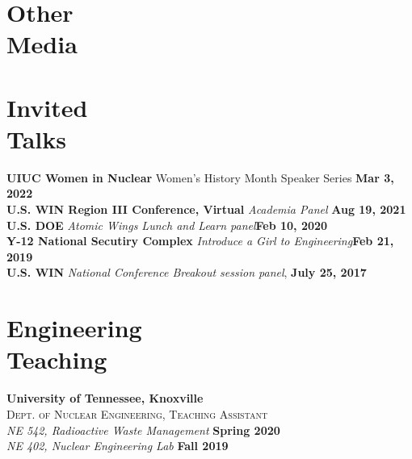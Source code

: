 \documentclass[margin,line]{resume}
\begin{document}
\begin{resume}
    \section{\mysidestyle Other\\Media}
    \begin{bibenum}
        \item {}
        \item {}
    \end{bibenum}
    \section{\mysidestyle Invited\\Talks}
    \textbf{UIUC Women in Nuclear} Women's History Month Speaker Series \hfill\textbf{Mar 3, 2022}\\
    \textbf{U.S. WIN Region III Conference, Virtual} \textsl{Academia Panel} \hfill \textbf{Aug 19, 2021}\\
    \textbf{U.S. DOE} \textsl{Atomic Wings Lunch and Learn panel}\hfill \textbf{Feb 10, 2020} \\
    \textbf{Y-12 National Secutiry Complex} \textsl{Introduce a Girl to Engineering}\hfill \textbf{Feb 21, 2019} \\
    \textbf{U.S. WIN} \textsl{National Conference Breakout session panel}, \hfill \textbf{July 25, 2017} \\
    \section{\mysidestyle Engineering\\Teaching}
    \textbf{University of Tennessee, Knoxville}\\
    \textsc{Dept. of Nuclear Engineering, Teaching Assistant}\\
               \textsl{NE 542, Radioactive Waste Management} \hfill \textbf{Spring 2020}\\
               \textsl{NE 402, Nuclear Engineering Lab} \hfill \textbf{Fall 2019}
               \vspace{2mm}


\end{resume}
\end{document}
